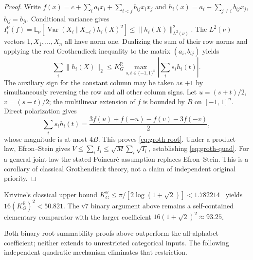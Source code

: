 \documentclass[11pt]{article}
\numberwithin{equation}{section}
\theoremstyle{remark}
\newcommand{\E}{\mathbb E}
\newcommand{\Var}{\operatorname{Var}}
\begin{document}
\begin{proof}
Write $f(x)=c+\sum_i a_ix_i+\sum_{i<j}b_{ij}x_ix_j$ and $h_i(x)=a_i+\sum_{j\ne i}b_{ij}x_j$, $b_{ij}=b_{ji}$. Conditional variance gives $I_i^\nu(f)=\E_\nu[\Var(X_i\mid X_{-i})h_i(X)^2]\le\|h_i(X)\|_{L^2(\nu)}^2$. The $L^2(\nu)$ vectors $1,X_1,\ldots,X_n$ all have norm one. Dualizing the sum of their row norms and applying the real Grothendieck inequality to the matrix $(a_i,b_{ij})$ yields
\[
 \sum_i\|h_i(X)\|_2\le K_G^{\mathbb R}\max_{s,t\in\{-1,1\}^n}\left|\sum_i s_i h_i(t)\right|.
\]
The auxiliary sign for the constant column may be taken as $+1$ by simultaneously reversing the row and all other column signs. Let $u=(s+t)/2$, $v=(s-t)/2$; the multilinear extension of $f$ is bounded by $B$ on $[-1,1]^n$. Direct polarization gives
\[
 \sum_i s_i h_i(t)=\frac{3f(u)+f(-u)-f(v)-3f(-v)}2,
\]
whose magnitude is at most $4B$. This proves \eqref{eq:groth-root}. Under a product law, Efron--Stein gives $V\le\sum_i I_i\le\sqrt M\sum_i\sqrt{I_i}$, establishing \eqref{eq:groth-quad}. For a general joint law the stated Poincar\'e assumption replaces Efron--Stein. This is a corollary of classical Grothendieck theory, not a claim of independent original priority.
\end{proof}
\noindent Krivine's classical upper bound $K_G^{\mathbb R}\le\pi/[2\log(1+\sqrt2)]<1.782214$~\cite{Pisier12} yields $16(K_G^{\mathbb R})^2<50.821$. The v7 binary argument above remains a self-contained elementary comparator with the larger coefficient $16(1+\sqrt2)^2\approx93.25$.

Both binary root-summability proofs above outperform the all-alphabet coefficient; neither extends to unrestricted categorical inputs. The following independent quadratic mechanism eliminates that restriction.
\end{document}
